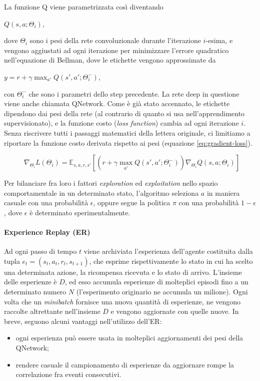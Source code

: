 \documentclass[twoside,twocolumn,10pt]{extarticle}
\theoremstyle{definition}
\begin{document}
		La funzione Q viene parametrizzata così diventando
		\begin{center}
			$Q(s, a; \Theta_i)$,
		\end{center}
		dove $\Theta_i$ sono i pesi della rete convoluzionale durante l'iterazione $i$-esima, e vengono aggiustati ad ogni iterazione per minimizzare l'errore quadratico nell'equazione di Bellman, dove le etichette vengono approssimate da
		\begin{center}
			$y = r + \gamma \max_{a'} Q(s', a'; \Theta_i^-)$,
		\end{center}
		con $\Theta_i^-$ che sono i parametri dello step precedente. La rete deep in questione viene anche chiamata Q\texttwelveudash Network. Come è già stato accennato, le etichette dipendono dai pesi della rete (al contrario di quanto si usa nell'apprendimento supervisionato), e la funzione costo (\textit{loss function}) cambia ad ogni iterazione $i$. Senza riscrivere tutti i passaggi matematici della lettera originale, ci limitiamo a riportare la funzione costo derivata rispetto ai pesi (equazione \ref{eq:gradient-loss}).
		\begin{figure}
			\begin{equation}\label{eq:gradient-loss}
				\nabla_{\Theta_i} L(\Theta_i) = \mathbb{E}_{s, a, r, s'} [(r + \gamma \max_{a'} Q(s', a'; \Theta_i^-)) \nabla_{\Theta_i} Q(s, a; \Theta_i)]
			\end{equation}
		\end{figure}
		Per bilanciare fra loro i fattori \textit{exploration} ed \textit{exploitation} nello spazio comportamentale in un determinato stato, l'algoritmo seleziona $a$ in maniera casuale con una probabilità $\epsilon$, oppure segue la politica $\pi$ con una probabilità $1 - \epsilon$, dove $\epsilon$ è determinato sperimentalmente.

		\paragraph*{Experience Replay (ER)}\label{par:er} Ad ogni passo di tempo $t$ viene archiviata l'esperienza dell'agente costituita dalla tupla $e_t = (s_t, a_t, r_t, s_{t + 1})$, che esprime rispettivamente lo stato in cui ha scelto una determinata azione, la ricompensa ricevuta e lo stato di arrivo. L'insieme delle esperienze è $D$, ed esso accumula esperienze di molteplici episodi fino a un determinato numero $N$ (l'esperimento originario ne accumula un milione). Ogni volta che un \textit{minibatch} fornisce una nuova quantità di esperienze, ne vengono raccolte altrettante nell'insieme $D$ e vengono aggiornate con quelle nuove. In breve, seguono alcuni vantaggi nell'utilizzo dell'ER:
		\begin{itemize}
			\item ogni esperienza può essere usata in molteplici aggiornamenti dei pesi della Q\texttwelveudash Network;
			\item rendere casuale il campionamento di esperienze da aggiornare rompe la correlazione fra eventi consecutivi.
		\end{itemize}
	
\end{document}

